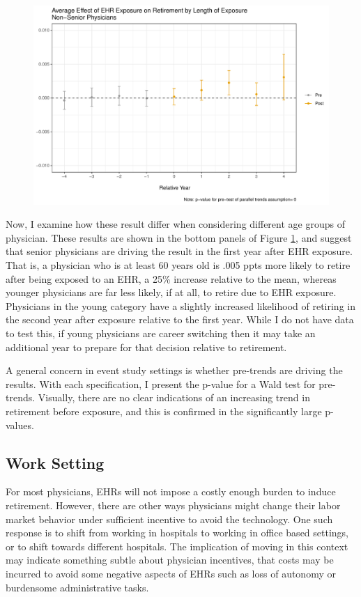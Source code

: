\documentclass[11pt]{article}
\begin{document}
\begin{figure}[ht]
{\begin{minipage}[b]{0.47\linewidth}
            \includegraphics[width=\textwidth]{Objects/CS_retireyoung_allEHR.pdf}
        \end{minipage}}
        \label{fig:retirefirst}
\end{figure}

Now, I examine how these result differ when considering different age groups of physician. These results are shown in the bottom panels of Figure \ref{fig:retirefirst}, and suggest that senior physicians are driving the result in the first year after EHR exposure. That is, a physician who is at least 60 years old is .005 ppts more likely to retire after being exposed to an EHR, a 25\% increase relative to the mean, whereas younger physicians are far less likely, if at all, to retire due to EHR exposure. Physicians in the young category have a slightly increased likelihood of retiring in the second year after exposure relative to the first year. While I do not have data to test this, if young physicians are career switching then it may take an additional year to prepare for that decision relative to retirement.   

A general concern in event study settings is whether pre-trends are driving the results. With each specification, I present the p-value for a Wald test for pre-trends. Visually, there are no clear indications of an increasing trend in retirement before exposure, and this is confirmed in the significantly large p-values.


\subsection{Work Setting}

For most physicians, EHRs will not impose a costly enough burden to induce retirement. However, there are other ways physicians might change their labor market behavior under sufficient incentive to avoid the technology. One such response is to shift from working in hospitals to working in office based settings, or to shift towards different hospitals. The implication of moving in this context may indicate something subtle about physician incentives, that costs may be incurred to avoid some negative aspects of EHRs such as loss of autonomy or burdensome administrative tasks.
\end{document}
